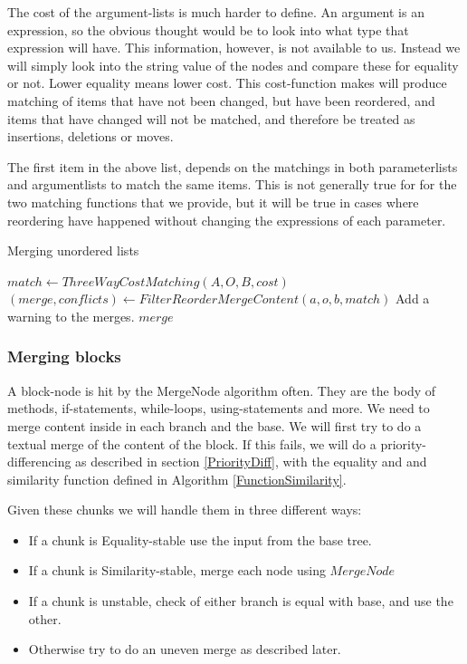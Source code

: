 \documentclass[11pt]{article}
\begin{document}
The cost of the argument-lists is much harder to define. An argument is an expression, so the obvious thought would be to look into what type that expression will have. This information, however, is not available to us. Instead we will simply look into the string value of the nodes and compare these for equality or not. Lower equality means lower cost. This cost-function makes will produce matching of items that have not been changed, but have been reordered, and items that have changed will not be matched, and therefore be treated as insertions, deletions or moves.

The first item in the above list, depends on the matchings in both parameterlists and argumentlists to match the same items. This is not generally true for for the two matching functions that we provide, but it will be true in cases where reordering have happened without changing the expressions of each parameter.

\begin{algorithm}
  \caption{Merging unordered lists}
  \label{Listmerger}
\begin{algorithmic}
    \State $match \gets ThreeWayCostMatching(A, O, B, cost)$
    \State $(merge, conflicts) \gets FilterReorderMergeContent(a, o, b, match)$
        \State Add a warning to the merges.
    \EndFor
    \State \Return $merge$
\EndFunction
\end{algorithmic}
\end{algorithm}

\subsubsection{Merging blocks}
A block-node is hit by the MergeNode algorithm often. They are the body of methods, if-statements, while-loops, using-statements and more. We need to merge content inside in each branch and the base. We will first try to do a textual merge of the content of the block. If this fails, we will do a priority-differencing as described in section \ref{PriorityDiff}, with the equality and and similarity function defined in Algorithm \ref{FunctionSimilarity}.

Given these chunks we will handle them in three different ways: 

\begin{itemize}
	\item If a chunk is Equality-stable use the input from the base tree.
	\item If a chunk is Similarity-stable, merge each node using $MergeNode$
	\item If a chunk is unstable, check of either branch is equal with base, and use the other.
	\item Otherwise try to do an uneven merge as described later.
\end{itemize}
\end{document}
